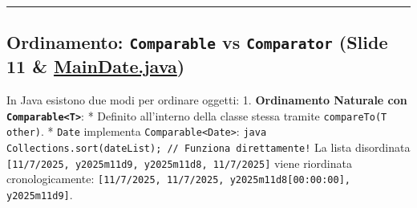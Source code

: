 \documentclass[11pt,a4paper,oneside]{report}
\newcommand{\passthrough}[1]{#1}
\begin{document}
\begin{center}\rule{0.5\linewidth}{0.5pt}\end{center}

\subsection{\texorpdfstring{Ordinamento: \texttt{Comparable} vs
\texttt{Comparator} (Slide 11 \&
\href{file:///home/wally/Documenti/GitHub/Programmazione-II/25-26/Teoria-e-Esercitazioni/Codice-20260902/Lezione15/MavenDate/src/main/java/it/oop/ui/MainDate.java\#L70-L88}{MainDate.java})}{Ordinamento: Comparable vs Comparator (Slide 11 \& MainDate.java)}}\label{chap14_ordinamento-comparable-vs-comparator-slide-11-maindate.java}

In Java esistono due modi per ordinare oggetti: 1. \textbf{Ordinamento
Naturale con \passthrough{\lstinline!Comparable<T>!}}: * Definito
all'interno della classe stessa tramite
\passthrough{\lstinline!compareTo(T other)!}. *
\passthrough{\lstinline!Date!} implementa
\passthrough{\lstinline!Comparable<Date>!}:
\passthrough{\lstinline"java      Collections.sort(dateList); // Funziona direttamente!"}
La lista disordinata
\passthrough{\lstinline![11/7/2025, y2025m11d9, y2025m11d8, 11/7/2025]!}
viene riordinata cronologicamente:
\passthrough{\lstinline![11/7/2025, 11/7/2025, y2025m11d8[00:00:00], y2025m11d9]!}.
\end{document}
